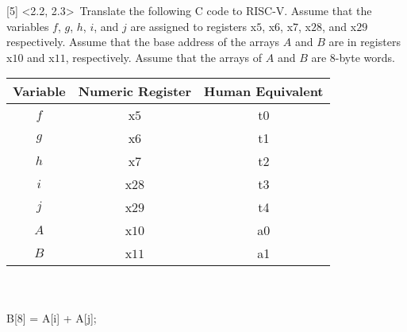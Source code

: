 \documentclass[12pt]{article}
\begin{document}
		
		
		
		
		\newpage
		
		
		
		
		
		\noindent {} 
		[5] \textless2.2, 2.3\textgreater \ Translate the following C code to RISC-V. Assume that the variables $f$, $g$, $h$, $i$, and $j$ are assigned to registers x$5$, x$6$, x$7$, x$28$, and x$29$ respectively. Assume that the base address of the arrays $A$ and $B$ are in registers x$10$ and x$11$, respectively. Assume that the arrays of $A$ and $B$ are 8-byte words. \vspace{0.15cm} \\
		\begin{center}
			
			\begin{tabular}{ |c|c|c| } 
				\hline
				Variable & Numeric Register & Human Equivalent \\
				\hline
				$f$ & x$5$ & t0 \\ 
				\hline
				$g$ & x$6$  &  t1 \\ 
				\hline
				$h$ & x$7$  &  t2 \\ 
				\hline
				$i$ & x$28$  & t3 \\
				\hline
				$j$ & x$29$  &  t4 \\ 
				\hline
				$A$ & x$10$  &  a0 \\ 
				\hline
				$B$ & x$11$  &  a1 \\
				\hline
				
			\end{tabular}
			\vspace{0.8cm} \\
			 \vspace{0.3cm} \\
			
			B[8] = A[i] + A[j]; \vspace{0.5cm} \\
			
			 \vspace{0.08cm} \\
			

\end{center}
\end{document}

